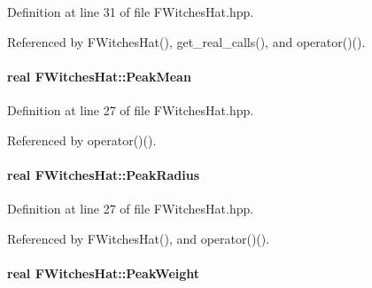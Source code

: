 \-Definition at line 31 of file \-F\-Witches\-Hat.\-hpp.



\-Referenced by \-F\-Witches\-Hat(), get\-\_\-real\-\_\-calls(), and operator()().

\hypertarget{classFWitchesHat_aad2c11957a2edf796a2728f2b0bf838e}{
\paragraph[{\-Peak\-Mean}]{\setlength{\rightskip}{0pt plus 5cm}real {\bf \-F\-Witches\-Hat\-::\-Peak\-Mean}}}\label{classFWitchesHat_aad2c11957a2edf796a2728f2b0bf838e}


\-Definition at line 27 of file \-F\-Witches\-Hat.\-hpp.



\-Referenced by operator()().

\hypertarget{classFWitchesHat_a94abd4eea4b5e4623446a2688bd8c849}{
\paragraph[{\-Peak\-Radius}]{\setlength{\rightskip}{0pt plus 5cm}real {\bf \-F\-Witches\-Hat\-::\-Peak\-Radius}}}\label{classFWitchesHat_a94abd4eea4b5e4623446a2688bd8c849}


\-Definition at line 27 of file \-F\-Witches\-Hat.\-hpp.



\-Referenced by \-F\-Witches\-Hat(), and operator()().

\hypertarget{classFWitchesHat_a6bc557f3f9e39384c3273551d599120c}{
\paragraph[{\-Peak\-Weight}]{\setlength{\rightskip}{0pt plus 5cm}real {\bf \-F\-Witches\-Hat\-::\-Peak\-Weight}}}\label{classFWitchesHat_a6bc557f3f9e39384c3273551d599120c}


